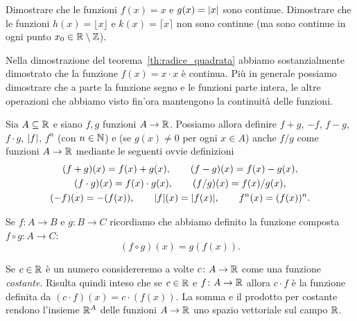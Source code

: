 \begin{exercise}
Dimostrare che le funzioni $f(x) = x$ e $g(x)={\left|x\right|}$ sono continue.
Dimostrare che le funzioni $h(x) = \lfloor x\rfloor$ e $k(x)=\lceil x \rceil$
non sono continue (ma sono continue in ogni punto
$x_0\in \mathbb R \setminus \mathbb Z$).
\end{exercise}

Nella dimostrazione del teorema~\ref{th:radice_quadrata}
abbiamo sostanzialmente dimostrato che la funzione $f(x)=x\cdot x$
è continua. Più in generale possiamo dimostrare che
a parte la funzione segno e le funzioni parte intera,
le altre operazioni che abbiamo visto fin'ora
mantengono la continuità delle funzioni.

\begin{definition}
Sia $A \subseteq \mathbb R$ e siano $f,g$ funzioni $A \to \mathbb R$.
Possiamo allora definire
$f+g$, $-f$, $f-g$, $f\cdot g$, ${\left|f\right|}$, $f^n$ (con $n\in \mathbb N$)
e (se $g(x)\neq 0$ per ogni $x\in A$) anche $f/g$
come funzioni $A \to \mathbb R$ mediante le seguenti ovvie
definizioni
\begin{gather*}
(f+g)(x) = f(x) + g(x), \qquad
(f-g)(x) = f(x) - g(x), \\
(f\cdot g)(x) = f(x) \cdot g(x), \qquad
(f/g)(x) = f(x) / g(x), \\
(-f)(x) = -(f(x)), \qquad
{\left|f\right|}(x) = {\left|f(x)\right|}, \qquad
f^n(x) = (f(x))^n.
\end{gather*}

Se $f\colon A \to B$ e $g\colon B\to C$ ricordiamo
che abbiamo definito la funzione composta
$f\circ g\colon A \to C$:
\[
  (f\circ g)(x) = g(f(x)).
\]

Se $c\in \mathbb R$ è un numero considereremo a volte $c\colon A \to \mathbb R$
come una funzione \emph{costante}.
Risulta quindi inteso che se $c\in \mathbb R$ e $f\colon A \to \mathbb R$
allora $c\cdot f$ è la funzione definita da
$(c\cdot f)(x) = c\cdot (f(x))$.
La somma e il prodotto per costante rendono l'insieme $\mathbb R^A$
delle funzioni $A \to \mathbb R$ uno spazio vettoriale sul campo $\mathbb R$.
\end{definition}

